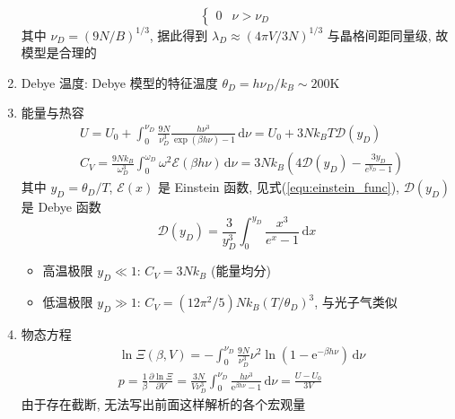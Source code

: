 \documentclass[12pt,a4paper]{article}%
\numberwithin{equation}{section}
\newcommand{\diff}{\,\mathrm{d}}
\newcommand\e{\mathrm{e}}%
\begin{document}
\begin{enumerate}
\begin{equation}
\begin{cases}
        0                     &\nu >\nu_D
        \end{cases}
    \end{equation}
    其中 $\nu_D = (9N/B)^{1/3}$, 据此得到 $\lambda_D \approx (4\pi V/3N)^{1/3}$ 与晶格间距同量级, 故模型是合理的
    \item Debye 温度: Debye 模型的特征温度 $\theta_D = h\nu_D/k_B\sim 200$K
    \item 能量与热容
    \begin{align}
        &U = U_0 + \int_0^{\nu_D}\frac{9N}{\nu_D^3}\frac{h\nu^3}{\exp(\beta h\nu) - 1}\diff\nu 
        = U_0 + 3Nk_BT\mathcal D(y_D) \\
        &C_V = \frac{9Nk_B}{\omega_D^3}\int_0^{\omega_D} \omega^2\mathcal E(\beta h\nu)\diff\nu 
        = 3Nk_B\left(4\mathcal D(y_D) - \frac{3y_D}{e^{y_D} - 1}\right)
    \end{align}
    其中 $y_D = \theta_D/T$, $\mathcal E(x)$ 是 Einstein 函数, 见式(\ref{equ:einstein_func}), $\mathcal D(y_D)$ 是 Debye 函数
    \begin{equation}\label{equ:debye_func}
        \mathcal D(y_D) = \frac 3{y_D^3}\int_0^{y_D}\frac{x^3}{e^x-1}\diff x
    \end{equation}
    \begin{itemize}
        \item 高温极限 $y_D\ll 1$: $C_V = 3Nk_B$ (能量均分)
        \item 低温极限 $y_D\gg 1$: $C_V = (12\pi^2/5)Nk_B(T/\theta_D)^3$, 
        与光子气类似
    \end{itemize}
    \item 物态方程
    \begin{align}
        &\ln\Xi(\beta,V) = -\int_0^{\nu_D}\frac{9N}{\nu_D^3}\nu^2\ln(1-\e^{-\beta h\nu})\diff\nu \\
        &p = \frac 1\beta\frac{\partial\ln\Xi}{\partial V} 
        = \frac{3N}{V\nu_D^3}\int_0^{\nu_D}\frac{h\nu^3}{\e^{\beta h\nu}-1}\diff\nu = \frac{U-U_0}{3V}
    \end{align}
    由于存在截断, 无法写出前面这样解析的各个宏观量
\end{enumerate}
\end{document}

